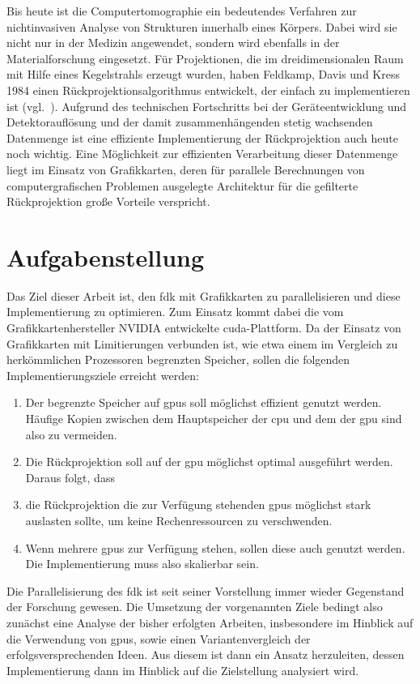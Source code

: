 Bis heute ist die Computertomographie ein bedeutendes Verfahren zur nichtinvasiven Analyse von Strukturen innerhalb
eines Körpers. Dabei wird sie nicht nur in der Medizin angewendet, sondern wird ebenfalls in der Materialforschung
eingesetzt. Für Projektionen, die im dreidimensionalen Raum mit Hilfe eines Kegelstrahls erzeugt wurden, haben Feldkamp,
Davis und Kress 1984 einen Rückprojektionsalgorithmus entwickelt, der einfach zu implementieren ist (vgl.~\cite{fdk}).
Aufgrund des technischen Fortschritts bei der Geräteentwicklung und Detektorauflösung und der damit zusammenhängenden
stetig wachsenden Datenmenge ist eine effiziente Implementierung der Rückprojektion auch heute noch wichtig. Eine
Möglichkeit zur effizienten Verarbeitung dieser Datenmenge liegt im Einsatz von Grafikkarten, deren für parallele
Berechnungen von computergrafischen Problemen ausgelegte Architektur für die gefilterte Rückprojektion große Vorteile
verspricht.

\section{Aufgabenstellung}\label{intro:aufgabenstellung}

Das Ziel dieser Arbeit ist, den \gls{fdk} mit Grafikkarten zu parallelisieren und diese Implementierung zu optimieren.
Zum Einsatz kommt dabei die vom Grafikkartenhersteller NVIDIA entwickelte \gls{cuda}-Plattform. Da der Einsatz von
Grafikkarten mit Limitierungen verbunden ist, wie etwa einem im Vergleich zu herkömmlichen Prozessoren begrenzten
Speicher, sollen die folgenden Implementierungsziele erreicht werden:

\begin{enumerate}
    \item Der begrenzte Speicher auf \gls{gpu}s soll möglichst effizient genutzt werden. Häufige Kopien zwischen dem
          Hauptspeicher der \gls{cpu} und dem der \gls{gpu} sind also zu vermeiden.
    \item Die Rückprojektion soll auf der \gls{gpu} möglichst optimal ausgeführt werden. Daraus folgt, dass
    \item die Rückprojektion die zur Verfügung stehenden \gls{gpu}s möglichst stark auslasten sollte, um keine
          Rechenressourcen zu verschwenden.
    \item Wenn mehrere \gls{gpu}s zur Verfügung stehen, sollen diese auch genutzt werden. Die Implementierung muss also
          skalierbar sein.
\end{enumerate}

Die Parallelisierung des \gls{fdk} ist seit seiner Vorstellung immer wieder Gegenstand der Forschung gewesen. Die
Umsetzung der vorgenannten Ziele bedingt also zunächst eine Analyse der bisher erfolgten Arbeiten, insbesondere im
Hinblick auf die Verwendung von \gls{gpu}s, sowie einen Variantenvergleich der erfolgsversprechenden Ideen. Aus diesem
ist dann ein Ansatz herzuleiten, dessen Implementierung dann im Hinblick auf die Zielstellung analysiert wird.
